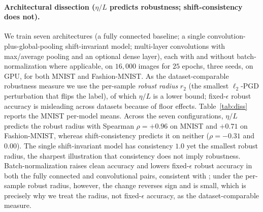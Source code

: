 \documentclass{article}
\theoremstyle{definition}
\begin{document}
\paragraph{Architectural dissection ($\eta/L$ predicts robustness; shift-consistency does not).} We train seven architectures (a fully connected baseline; a single convolution-plus-global-pooling shift-invariant model; multi-layer convolutions with max/average pooling and an optional dense layer), each with and without batch-normalization where applicable, on $16{,}000$ images for $25$ epochs, three seeds, on GPU, for both MNIST and Fashion-MNIST. As the dataset-comparable robustness measure we use the per-sample \emph{robust radius} $r_2$ (the smallest $\ell_2$-PGD perturbation that flips the label), of which $\eta/L$ is a lower bound; fixed-$\epsilon$ robust accuracy is misleading across datasets because of floor effects. Table~\ref{tab:diss} reports the MNIST per-model means. Across the seven configurations, $\eta/L$ predicts the robust radius with Spearman $\rho=+0.96$ on MNIST and $+0.71$ on Fashion-MNIST, whereas shift-consistency predicts it on neither ($\rho=-0.31$ and $0.00$). The single shift-invariant model has consistency $1.0$ yet the smallest robust radius, the sharpest illustration that consistency does not imply robustness. Batch-normalization raises clean accuracy and lowers fixed-$\epsilon$ robust accuracy in both the fully connected and convolutional pairs, consistent with \citet{galloway2019batchnorm}; under the per-sample robust radius, however, the change reverses sign and is small, which is precisely why we treat the radius, not fixed-$\epsilon$ accuracy, as the dataset-comparable measure.
\end{document}

